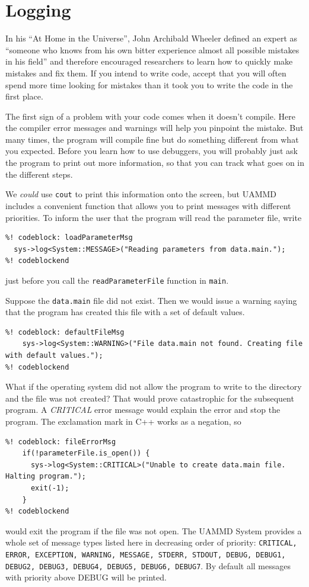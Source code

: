 \section{Logging}

In his ``At Home in the Universe'', John Archibald Wheeler defined an expert as
``someone who knows from his own bitter experience almost all possible mistakes
in his field'' and therefore encouraged researchers to learn how to quickly make
mistakes and fix them. If you intend to write code, accept that you will often
spend more time looking for mistakes than it took you to write the code in the
first place.

The first sign of a problem with your code comes when it doesn't compile. Here 
the compiler error messages and	warnings will help you pinpoint	the mistake. But 
many times, the program will compile fine but do something different from what 
you expected. Before you learn how to use debuggers, you will probably just ask 
the program to print out more information, so that you can track what goes on in 
the different steps.

We \textit{could} use \texttt{cout} to print this information onto the screen, 
but UAMMD includes a convenient function that allows you to print messages with 
different priorities. To inform the user that the program will read the 
parameter file, write
\begin{lstlisting}
%! codeblock: loadParameterMsg
  sys->log<System::MESSAGE>("Reading parameters from data.main.");
%! codeblockend
\end{lstlisting}
just before you call the \texttt{readParameterFile} function in \texttt{main}.

Suppose the \texttt{data.main} file did not exist. Then we would issue a warning
saying that the program has created this file with a set of default values.
\begin{lstlisting}
%! codeblock: defaultFileMsg
    sys->log<System::WARNING>("File data.main not found. Creating file with default values.");
%! codeblockend
\end{lstlisting}
What if the operating system did not allow the program to write to the directory
and the file was not created? That would prove catastrophic for the subsequent
program. A \textit{CRITICAL} error message would explain the error and stop the
program. The exclamation mark in C++ works as a negation, so
\begin{lstlisting}
%! codeblock: fileErrorMsg
    if(!parameterFile.is_open()) {
      sys->log<System::CRITICAL>("Unable to create data.main file. Halting program.");
      exit(-1);
    }
%! codeblockend
\end{lstlisting}
would exit the program if the file was not open. The UAMMD System provides a
whole set of message types listed here in decreasing order of priority:
\texttt{CRITICAL, ERROR, EXCEPTION, WARNING, MESSAGE, STDERR, STDOUT,
DEBUG, DEBUG1, DEBUG2, DEBUG3, DEBUG4, DEBUG5, DEBUG6, DEBUG7}. By default all
messages with priority above DEBUG will be printed.

